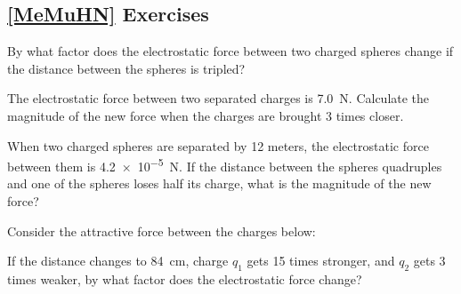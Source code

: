 \documentclass[dvipsnames]{article}
\begin{document}
\subsection*{\ref{MeMuHN} Exercises}

\begin{exercise} \label{WFMudS}
    By what factor does the electrostatic force between two charged spheres change if the distance between the spheres is tripled?
\end{exercise}

\begin{exercise} \label{t77ZZC}
    The electrostatic force between two separated charges is \SI{7.0}{N}. Calculate the magnitude of the new force when the charges are brought 3 times closer. 
\end{exercise}

\begin{exercise} \label{yCR62E}
    When two charged spheres are separated by 12 meters, the electrostatic force between them is \SI{4.2e-5}{N}. If the distance between the spheres quadruples and one of the spheres loses half its charge, what is the magnitude of the new force?
\end{exercise}

\begin{exercise} \label{y5ONvE}
    Consider the attractive force between the charges below:

\begin{center}
\end{center}

If the distance changes to \SI{84}{cm}, charge $q_1$ gets 15 times stronger, and $q_2$ gets 3 times weaker, by what factor does the electrostatic force change?
\end{exercise}
\end{document}
